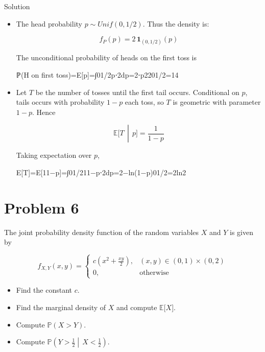 \documentclass{qlnotes-export}
\begin{document}
\begin{qlsolution}{Solution}

\begin{itemize}
\item
  The head probability \(p \sim Unif(0,1/2)\). Thus the density is:

  \[f_{P}(p) = 2\,\mathbf{1}_{(0,1/2)}(p)\]

  The unconditional probability of heads on the first toss is

  {ℙ(H on first toss)=E{[}p{]}=∫01/2p⋅2dp=2⋅p2201/2=14}
\item
  Let \(T\) be the number of tosses until the first tail occurs. Conditional on \(p\), tails occurs with probability \(1 - p\) each toss, so \(T\) is geometric with parameter \(1 - p\). Hence

  \[\left. {\mathbb{E}}\lbrack T\, \middle| \, p\rbrack = \frac{1}{1 - p} \right.\]

  Taking expectation over \(p\),

  {E{[}T{]}=E{[}11−p{]}=∫01/211−p⋅2dp=2−ln(1−p)01/2=2ln2}
\end{itemize}

\end{qlsolution}

\section{Problem 6}\label{problem-6-3}

The joint probability density function of the random variables \(X\) and \(Y\) is given by

\[f_{X,Y}(x,y) = \left\{ \begin{matrix}
{c\left( {x^{2} + \frac{xy}{2}} \right),} & {(x,y) \in (0,1) \times (0,2)} \\
{0,} & \text{otherwise}
\end{matrix} \right.\]

\begin{itemize}
\item
  Find the constant \(c\).
\item
  Find the marginal density of \(X\) and compute \({\mathbb{E}}\lbrack X\rbrack\).
\item
  Compute \({\mathbb{P}}(X > Y)\).
\item
  Compute \({\mathbb{P}}\left( Y > \frac{1}{2} \middle| \, X < \frac{1}{2} \right)\).
\end{itemize}
\end{document}

